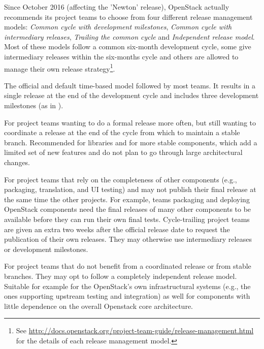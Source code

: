 \documentclass[dvipsnames]{interact}
\theoremstyle{plain}\newtheorem{theorem}{Theorem}[section]
\theoremstyle{definition}
\theoremstyle{remark}
\begin{document}
Since October 2016 (affecting the 'Newton' release), OpenStack actually recommends its project teams to choose from four different release management models: \emph{Common cycle with development milestones}, \emph{Common cycle with intermediary releases}, \emph{Trailing the common cycle} and \emph{Independent release model}.  
Most of these models follow a common six-month development cycle, some give intermediary releases within the six-months cycle and others are allowed to manage their own release strategy\footnote{See \url{http://docs.openstack.org/project-team-guide/release-management.html} for the details of each release management model.}.  

\begin{description}[leftmargin=!]
\footnotesize
\item[Common cycle with development milestones] The official and default time-based model followed by most teams. It results in a single release at the end of the development cycle and includes three development milestones (as in ).

\item[Common cycle with intermediary releases] For project teams wanting to do a formal release more often, but still wanting to coordinate a release at the end of the cycle from which to maintain a stable branch. Recommended for libraries and for more stable components, which add a limited set of new features and do not plan to go through large architectural changes.

\item[Trailing the common cycle]  For project teams that rely on the completeness of other components (e.g., packaging, translation, and UI testing) and may not publish their final release at the same time the other projects. For example, teams packaging and deploying OpenStack components need the final releases of many other components to be available before they can run their own final tests. Cycle-trailing project teams are given an extra two weeks after the official release date to request the publication of their own releases. They may otherwise use intermediary releases or development milestones. 

\item[Independent release model]  For project teams that do not benefit from a coordinated release or from stable branches. They may opt to follow a completely independent release model. Suitable for example for the OpenStack's own infrastructural systems (e.g., the ones supporting upstream testing and integration) as well for components with little dependence on the overall Openstack core architecture. 
\end{description}
\end{document}
